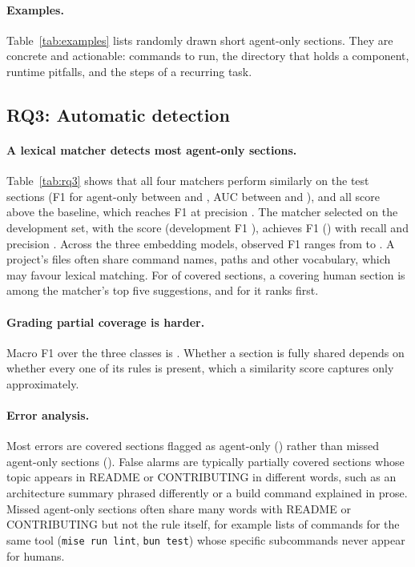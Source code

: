 \documentclass[sigconf,nonacm]{acmart}
\begin{document}
\paragraph{Examples.} Table~\ref{tab:examples} lists randomly drawn short agent-only sections. They
are concrete and actionable: commands to run, the directory that holds a component, runtime
pitfalls, and the steps of a recurring task.

\subsection{RQ3: Automatic detection}



\paragraph{A lexical matcher detects most agent-only sections.} Table~\ref{tab:rq3} shows that all
four matchers perform similarly on the \detectorNTest{} test sections (F1 for agent-only between
\detectorFOneMin{} and \detectorFOneMax, AUC between \detectorAUCMin{} and \detectorAUCMax), and all
score above the baseline, which reaches F1 \baselineFOne{} at precision \baselinePrecision. The
matcher selected on the development set, \detectorBestMatcher{} with the
\emph{\detectorBestVariant} score (development F1 \detectorDevFOne), achieves F1 \detectorFOne{}
(\detectorFOneCI) with recall \detectorRecall{} and precision \detectorPrecision. Across the three
embedding models, observed F1 ranges from \embedFOneMin{} to \embedFOneMax{}. A project's files
often share command names, paths and other vocabulary, which may favour lexical matching.
For \detectorHitFive{} of covered sections, a covering
human section is among the matcher's top five suggestions, and for \detectorHitOne{} it ranks first.

\paragraph{Grading partial coverage is harder.} Macro F1 over the three classes is
\detectorMacroFOne. Whether a section is fully shared depends on whether every one of its rules is
present, which a similarity score captures only approximately.

\paragraph{Error analysis.} Most errors are covered sections flagged as agent-only
(\detectorFalseAgentOnly) rather than missed agent-only sections (\detectorMissedAgentOnly). False
alarms are typically partially covered sections whose topic appears in README or CONTRIBUTING in
different words, such as an architecture summary phrased differently or a build command explained
in prose. Missed agent-only sections often share many words with README or CONTRIBUTING but not the
rule itself, for example lists of commands for the same tool (\texttt{mise run lint},
\texttt{bun test}) whose specific subcommands never appear for humans.
\end{document}
